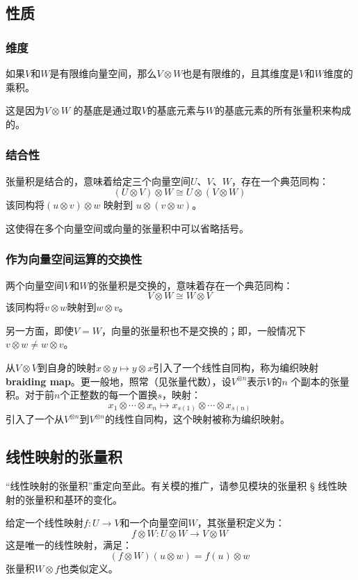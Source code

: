 \subsection{性质}
\subsubsection{维度}  
如果\( V \)和\( W \)是有限维向量空间，那么\( V \otimes W \)也是有限维的，且其维度是\( V \)和\( W \)维度的乘积。

这是因为\( V \otimes W \) 的基底是通过取\( V \)的基底元素与\( W \)的基底元素的所有张量积来构成的。
\subsubsection{结合性} 
张量积是结合的，意味着给定三个向量空间\( U \)、\( V \)、\( W \)，存在一个典范同构：
\[
(U \otimes V) \otimes W \cong U \otimes (V \otimes W)~
\]
该同构将\( (u \otimes v) \otimes w \) 映射到 \( u \otimes (v \otimes w) \)。

这使得在多个向量空间或向量的张量积中可以省略括号。
\subsubsection{作为向量空间运算的交换性}
两个向量空间\( V \)和\( W \)的张量积是交换的，意味着存在一个典范同构：
\[
V \otimes W \cong W \otimes V~
\]
该同构将\( v \otimes w \)映射到\( w \otimes v \)。

另一方面，即使\( V = W \)，向量的张量积也不是交换的；即，一般情况下\( v \otimes w \neq w \otimes v \)。

从\( V \otimes V \)到自身的映射\( x \otimes y \mapsto y \otimes x \)引入了一个线性自同构，称为编织映射\textbf{braiding map}。更一般地，照常（见张量代数），设\( V^{\otimes n} \)表示\( V \)的\( n \) 个副本的张量积。对于前\( n \)个正整数的每一个置换\( s \)，映射：
\[
x_1 \otimes \cdots \otimes x_n \mapsto x_{s(1)} \otimes \cdots \otimes x_{s(n)}~
\]
引入了一个从\( V^{\otimes n} \)到\( V^{\otimes n} \)的线性自同构，这个映射被称为编织映射。
\subsection{线性映射的张量积}
“线性映射的张量积”重定向至此。有关模的推广，请参见模块的张量积 § 线性映射的张量积和基环的变化。

给定一个线性映射\( f: U \to V \)和一个向量空间\( W \)，其张量积定义为：
\[
f \otimes W: U \otimes W \to V \otimes W~
\]
这是唯一的线性映射，满足：
\[
(f \otimes W)(u \otimes w) = f(u) \otimes w~
\]
张量积\( W \otimes f \)也类似定义。

